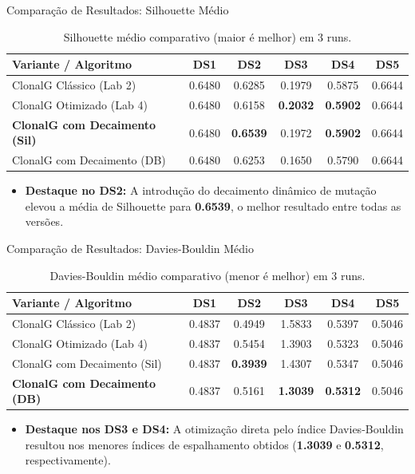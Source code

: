 \documentclass[aspectratio=169, 11pt]{beamer}
\begin{document}
\begin{frame}{Comparação de Resultados: Silhouette Médio}
  \begin{table}
    \centering
    \footnotesize
    \begin{tabular}{lccccc}
      \toprule
      Variante / Algoritmo & DS1 & DS2 & DS3 & DS4 & DS5 \\
      \midrule
      ClonalG Clássico (Lab 2) & 0.6480 & 0.6285 & 0.1979 & 0.5875 & 0.6644 \\
      ClonalG Otimizado (Lab 4) & 0.6480 & 0.6158 & \textbf{0.2032} & \textbf{0.5902} & 0.6644 \\
      \textbf{ClonalG com Decaimento (Sil)} & 0.6480 & \textbf{0.6539} & 0.1972 & \textbf{0.5902} & 0.6644 \\
      ClonalG com Decaimento (DB) & 0.6480 & 0.6253 & 0.1650 & 0.5790 & 0.6644 \\
      \bottomrule
    \end{tabular}
    \caption{Silhouette médio comparativo (maior é melhor) em 3 runs.}
  \end{table}
  \begin{itemize}
    \item \textbf{Destaque no DS2:} A introdução do decaimento dinâmico de mutação elevou a média de Silhouette para \textbf{0.6539}, o melhor resultado entre todas as versões.
  \end{itemize}
\end{frame}

\begin{frame}{Comparação de Resultados: Davies-Bouldin Médio}
  \begin{table}
    \centering
    \footnotesize
    \begin{tabular}{lccccc}
      \toprule
      Variante / Algoritmo & DS1 & DS2 & DS3 & DS4 & DS5 \\
      \midrule
      ClonalG Clássico (Lab 2) & 0.4837 & 0.4949 & 1.5833 & 0.5397 & 0.5046 \\
      ClonalG Otimizado (Lab 4) & 0.4837 & 0.5454 & 1.3903 & 0.5323 & 0.5046 \\
      ClonalG com Decaimento (Sil) & 0.4837 & \textbf{0.3939} & 1.4307 & 0.5347 & 0.5046 \\
      \textbf{ClonalG com Decaimento (DB)} & 0.4837 & 0.5161 & \textbf{1.3039} & \textbf{0.5312} & 0.5046 \\
      \bottomrule
    \end{tabular}
    \caption{Davies-Bouldin médio comparativo (menor é melhor) em 3 runs.}
  \end{table}
  \begin{itemize}
    \item \textbf{Destaque nos DS3 e DS4:} A otimização direta pelo índice Davies-Bouldin resultou nos menores índices de espalhamento obtidos (\textbf{1.3039} e \textbf{0.5312}, respectivamente).
  \end{itemize}
\end{frame}
\end{document}
